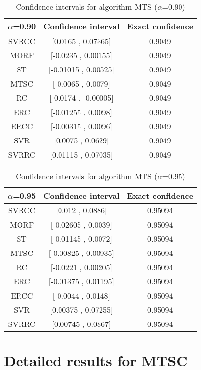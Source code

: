 \documentclass[a4paper,10pt]{article}
\begin{document}
\begin{table}[!htp]
\centering\small
\begin{tabular}{
|c|c|c|}
\hline
 $\alpha$=0.90 & Confidence interval & Exact confidence \\ \hline 
SVRCC & [0.0165 , 0.07365] & 0.9049\\ \hline 
MORF & [-0.0235 , 0.00155] & 0.9049\\ \hline 
ST & [-0.01015 , 0.00525] & 0.9049\\ \hline 
MTSC & [-0.0065 , 0.0079] & 0.9049\\ \hline 
RC & [-0.0174 , -0.00005] & 0.9049\\ \hline 
ERC & [-0.01255 , 0.0098] & 0.9049\\ \hline 
ERCC & [-0.00315 , 0.0096] & 0.9049\\ \hline 
SVR & [0.0075 , 0.0629] & 0.9049\\ \hline 
SVRRC & [0.01115 , 0.07035] & 0.9049\\ \hline 

\end{tabular}
\caption{Confidence intervals for algorithm MTS ($\alpha$=0.90)}
\end{table}
\begin{table}[!htp]
\centering\small
\begin{tabular}{
|c|c|c|}
\hline
 $\alpha$=0.95 & Confidence interval & Exact confidence \\ \hline 
SVRCC & [0.012 , 0.0886] & 0.95094\\ \hline 
MORF & [-0.02605 , 0.0039] & 0.95094\\ \hline 
ST & [-0.01145 , 0.0072] & 0.95094\\ \hline 
MTSC & [-0.00825 , 0.00935] & 0.95094\\ \hline 
RC & [-0.0221 , 0.00205] & 0.95094\\ \hline 
ERC & [-0.01375 , 0.01195] & 0.95094\\ \hline 
ERCC & [-0.0044 , 0.0148] & 0.95094\\ \hline 
SVR & [0.00375 , 0.07255] & 0.95094\\ \hline 
SVRRC & [0.00745 , 0.0867] & 0.95094\\ \hline 

\end{tabular}
\caption{Confidence intervals for algorithm MTS ($\alpha$=0.95)}
\end{table}

 \clearpage 


\section{Detailed results for MTSC}
\end{document}

